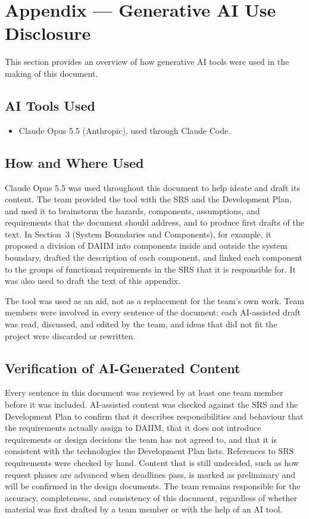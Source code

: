 \documentclass{article}
\begin{document}
\newpage{}

\section{Appendix --- Generative AI Use Disclosure}

This section provides an overview of how generative AI tools were used in the
making of this document.

\subsection{AI Tools Used}

\begin{itemize}
    \item Claude Opus 5.5 (Anthropic), used through Claude Code.
\end{itemize}

\subsection{How and Where Used}

Claude Opus 5.5 was used throughout this document to help ideate and draft its
content. The team provided the tool with the SRS and the Development Plan, and
used it to brainstorm the hazards, components, assumptions, and requirements
that the document should address, and to produce first drafts of the text.
In Section~3 (System Boundaries and Components), for example, it proposed a
division of DAIIM into components inside and outside the system boundary,
drafted the description of each component, and linked each component to the
groups of functional requirements in the SRS that it is responsible for. It was
also used to draft the text of this appendix.

The tool was used as an aid, not as a replacement for the team's own work.
Team members were involved in every sentence of the document: each AI-assisted
draft was read, discussed, and edited by the team, and ideas that did not fit
the project were discarded or rewritten.

\subsection{Verification of AI-Generated Content}

Every sentence in this document was reviewed by at least one team member
before it was included. AI-assisted content was checked against the SRS and
the Development Plan to confirm that it describes responsibilities and
behaviour that the requirements actually assign to DAIIM, that it does not
introduce requirements or design decisions the team has not agreed to, and
that it is consistent with the technologies the Development Plan lists.
References to SRS requirements were checked by hand. Content that is still
undecided, such as how request phases are advanced when deadlines pass, is
marked as preliminary and will be confirmed in the design documents. The team
remains responsible for the accuracy, completeness, and consistency of this
document, regardless of whether material was first drafted by a team member or
with the help of an AI tool.
\end{document}
